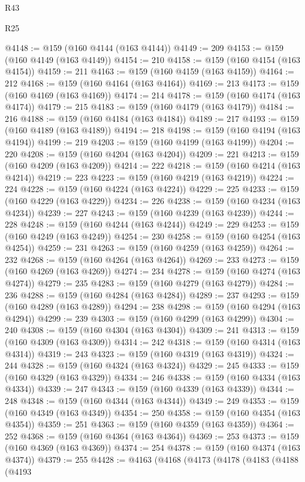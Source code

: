 \begin{lexlean}{R43}
\begin{lexlean}{R25}
\begin{coremodule}
{{{{{{{{{{{{{{{{{{{{{{{{{{{{{{{{{{{{{{{{{{{{{{{{{{{{{{{{{{{{{{{{{{{{{{{{{{{{{{{{{{{{{{{{{{{{{{{{{{{{{{{{{{{{{{{{{{{{{{{{{{{{{{{{{{{{{{{{{{{{{{{{{{{{{{{{{{{{{{{{{{{{{{{{{{{{{{{{{{{{{{{{{{{{{{{{{@4148 := @159 (@160 @4144 (@163 @4144))
@4149 := 209
@4153 := @159 (@160 @4149 (@163 @4149))
@4154 := 210
@4158 := @159 (@160 @4154 (@163 @4154))
@4159 := 211
@4163 := @159 (@160 @4159 (@163 @4159))
@4164 := 212
@4168 := @159 (@160 @4164 (@163 @4164))
@4169 := 213
@4173 := @159 (@160 @4169 (@163 @4169))
@4174 := 214
@4178 := @159 (@160 @4174 (@163 @4174))
@4179 := 215
@4183 := @159 (@160 @4179 (@163 @4179))
@4184 := 216
@4188 := @159 (@160 @4184 (@163 @4184))
@4189 := 217
@4193 := @159 (@160 @4189 (@163 @4189))
@4194 := 218
@4198 := @159 (@160 @4194 (@163 @4194))
@4199 := 219
@4203 := @159 (@160 @4199 (@163 @4199))
@4204 := 220
@4208 := @159 (@160 @4204 (@163 @4204))
@4209 := 221
@4213 := @159 (@160 @4209 (@163 @4209))
@4214 := 222
@4218 := @159 (@160 @4214 (@163 @4214))
@4219 := 223
@4223 := @159 (@160 @4219 (@163 @4219))
@4224 := 224
@4228 := @159 (@160 @4224 (@163 @4224))
@4229 := 225
@4233 := @159 (@160 @4229 (@163 @4229))
@4234 := 226
@4238 := @159 (@160 @4234 (@163 @4234))
@4239 := 227
@4243 := @159 (@160 @4239 (@163 @4239))
@4244 := 228
@4248 := @159 (@160 @4244 (@163 @4244))
@4249 := 229
@4253 := @159 (@160 @4249 (@163 @4249))
@4254 := 230
@4258 := @159 (@160 @4254 (@163 @4254))
@4259 := 231
@4263 := @159 (@160 @4259 (@163 @4259))
@4264 := 232
@4268 := @159 (@160 @4264 (@163 @4264))
@4269 := 233
@4273 := @159 (@160 @4269 (@163 @4269))
@4274 := 234
@4278 := @159 (@160 @4274 (@163 @4274))
@4279 := 235
@4283 := @159 (@160 @4279 (@163 @4279))
@4284 := 236
@4288 := @159 (@160 @4284 (@163 @4284))
@4289 := 237
@4293 := @159 (@160 @4289 (@163 @4289))
@4294 := 238
@4298 := @159 (@160 @4294 (@163 @4294))
@4299 := 239
@4303 := @159 (@160 @4299 (@163 @4299))
@4304 := 240
@4308 := @159 (@160 @4304 (@163 @4304))
@4309 := 241
@4313 := @159 (@160 @4309 (@163 @4309))
@4314 := 242
@4318 := @159 (@160 @4314 (@163 @4314))
@4319 := 243
@4323 := @159 (@160 @4319 (@163 @4319))
@4324 := 244
@4328 := @159 (@160 @4324 (@163 @4324))
@4329 := 245
@4333 := @159 (@160 @4329 (@163 @4329))
@4334 := 246
@4338 := @159 (@160 @4334 (@163 @4334))
@4339 := 247
@4343 := @159 (@160 @4339 (@163 @4339))
@4344 := 248
@4348 := @159 (@160 @4344 (@163 @4344))
@4349 := 249
@4353 := @159 (@160 @4349 (@163 @4349))
@4354 := 250
@4358 := @159 (@160 @4354 (@163 @4354))
@4359 := 251
@4363 := @159 (@160 @4359 (@163 @4359))
@4364 := 252
@4368 := @159 (@160 @4364 (@163 @4364))
@4369 := 253
@4373 := @159 (@160 @4369 (@163 @4369))
@4374 := 254
@4378 := @159 (@160 @4374 (@163 @4374))
@4379 := 255
@4428 := @4163
    (@4168
      (@4173
        (@4178
          (@4183
            (@4188
              (@4193
}}}}}}}}}}}}}}}}}}}}}}}}}}}}}}}}}}}}}}}}}}}}}}}}}}}}}}}}}}}}}}}}}}}}}}}}}}}}}}}}}}}}}}}}}}}}}}}}}}}}}}}}}}}}}}}}}}}}}}}}}}}}}}}}}}}}}}}}}}}}}}}}}}}}}}}}}}}}}}}}}}}}}}}}}}}}}}}}}}}}}}}}}}}}}}}}}
\end{coremodule}
\end{lexlean}
\end{lexlean}
